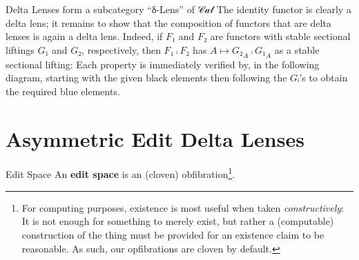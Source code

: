 \documentclass[12pt]{article}
\begin{document}
\begin{theorem}{Delta Lenses form a subcategory ``δ-Lens'' of 𝒞𝒶𝓉}
The identity functor is clearly a delta lens; it remains to show that the
composition of functors that are delta lenses is again a delta lens.  Indeed, if
\(F₁\) and \(F₂\) are functors with stable sectional liftings \(G₁\) and \(G₂\),
respectively, then \(F₁ ⨾ F₂\) has \(A ↦ {G₂}_A ⨾ {G₁}_A\) as a stable sectional
lifting: Each property is immediately verified by, in the following diagram,
starting with the given black elements then following the \(Gᵢ\)'s to obtain the
required blue elements.

\end{theorem}

\section{Asymmetric Edit Delta Lenses}
\label{sec:org2ce36bd}

\def\apply{\mathsf{apply}}
\def\control{\mathsf{control}}

\begin{definition}{Edit Space}
An \textbf{edit space} is an (cloven) obfibration\footnote{For computing purposes, existence is most useful when taken
\emph{constructively}: It is not enough for something to merely exist,
but rather a (computable) construction of the thing must be provided
for an existence claim to be reasonable. As such, our opfibrations
are cloven by default.}.
\end{definition}
\end{document}
